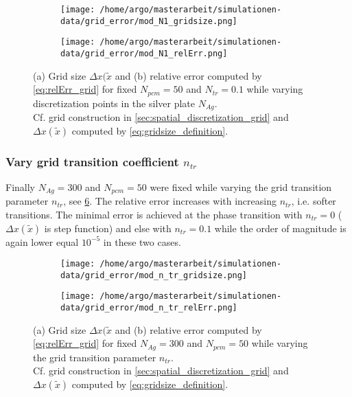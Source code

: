 \documentclass{scrartcl}[12pt, halfparskip]
\numberwithin{equation}{section}
\numberwithin{figure}{section}
\numberwithin{table}{section}
\begin{document}
\begin{figure}[H]
	\begin{subfigure}{0.49\textwidth}
		\texttt{[image: /home/argo/masterarbeit/simulationen-data/grid\_error/mod\_N1\_gridsize.png]}
		\caption{}
		\label{fig:gridsize_mod_N1}
	\end{subfigure}
	\begin{subfigure}{0.49\textwidth}
		\texttt{[image: /home/argo/masterarbeit/simulationen-data/grid\_error/mod\_N1\_relErr.png]}
		\caption{}
		\label{fig:grid_relErr_mod_N1}
	\end{subfigure}
	\caption{(a) Grid size $\Delta x(\tilde{x}$ and (b) relative error computed by \cref{eq:relErr_grid} for fixed $N_{pcm}=50$ and $N_{tr}=0.1$ while varying discretization points in the silver plate $N_{Ag}$. \\
	Cf. grid construction in \cref{sec:spatial_discretization_grid} and $\Delta x(\tilde{x})$ computed by \cref{eq:gridsize_definition}.}
	\label{fig:grid_mod_N1}
\end{figure}


\subsubsection{Vary grid transition coefficient $n_{tr}$}
Finally $N_{Ag}=300$ and $N_{pcm}=50$ were fixed while varying the grid transition parameter $n_{tr}$, see \cref{fig:grid_mod_n_tr}. The relative error increases with increasing $n_{tr}$, i.e. softer transitions. The minimal error is achieved at the phase transition with $n_{tr}=0$ ($\Delta x(\tilde{x})$ is step function) and else with $n_{tr}=0.1$ while the order of magnitude is again lower equal $10^{-5}$ in these two cases.

\begin{figure}[H]
	\begin{subfigure}{0.49\textwidth}
		\texttt{[image: /home/argo/masterarbeit/simulationen-data/grid\_error/mod\_n\_tr\_gridsize.png]}
		\caption{}
		\label{fig:gridsize_mod_n_tr}
	\end{subfigure}
	\begin{subfigure}{0.49\textwidth}
		\texttt{[image: /home/argo/masterarbeit/simulationen-data/grid\_error/mod\_n\_tr\_relErr.png]}
		\caption{}
		\label{fig:grid_relErr_mod_n_tr}
	\end{subfigure}
	\caption{(a) Grid size $\Delta x(\tilde{x}$ and (b) relative error computed by \cref{eq:relErr_grid} for fixed $N_{Ag}=300$ and $N_{pcm}=50$ while varying the grid transition parameter $n_{tr}$. \\
	Cf. grid construction in \cref{sec:spatial_discretization_grid} and $\Delta x(\tilde{x})$ computed by \cref{eq:gridsize_definition}.}
	\label{fig:grid_mod_n_tr}
\end{figure}
\end{document}
